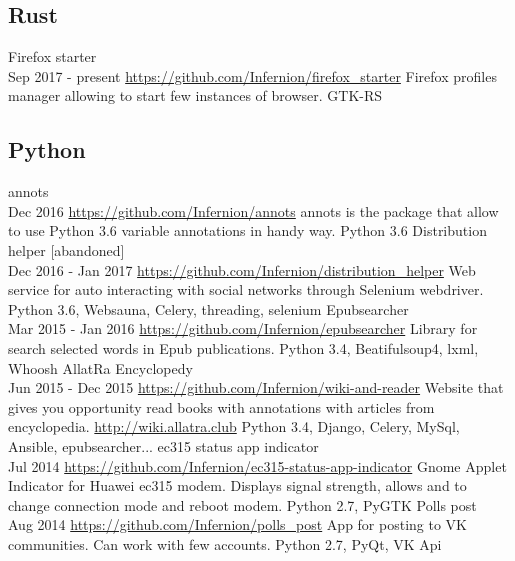 \documentclass[11pt,a4paper]{moderncv}
\begin{document}
	\subsection{Rust}
    \cvline
	{Firefox starter\\ Sep 2017 - present}
	{\url{https://github.com/Infernion/firefox_starter}\newline{}
		Firefox profiles manager allowing to start few instances of browser.\newline{}
		GTK-RS}
	\subsection{Python}
	\cvline
	{annots\\ Dec 2016}
	{\url{https://github.com/Infernion/annots}\newline{}
		annots is the package that allow to use Python 3.6 variable annotations in handy way.\newline{}
		Python 3.6}
	\cvline
	{Distribution helper [abandoned]\\ Dec 2016 - Jan 2017}
	{\url{https://github.com/Infernion/distribution_helper}\newline{}
		Web service for auto interacting with social networks through Selenium webdriver.\newline{}
		Python 3.6, Websauna, Celery, threading, selenium}
	\cvline
	{Epubsearcher\\ Mar 2015 - Jan 2016}
	{\url{https://github.com/Infernion/epubsearcher}\newline{}
		Library for search selected words in Epub publications.\newline{}
		Python 3.4, Beatifulsoup4, lxml, Whoosh}
	\cvline
	{AllatRa Encyclopedy\\ Jun 2015 - Dec 2015}
	{\url{https://github.com/Infernion/wiki-and-reader}\newline{}
	    Website that gives you opportunity read books with annotations
		with articles from encyclopedia. \url{http://wiki.allatra.club}\newline{}
		Python 3.4, Django, Celery, MySql, Ansible, epubsearcher...}
    \cvline
	{ec315 status app indicator\\ Jul 2014}
	{\url{https://github.com/Infernion/ec315-status-app-indicator}\newline{}
		Gnome Applet Indicator for Huawei ec315 modem. Displays signal strength, allows and to change connection mode and reboot modem.\newline{}
		Python 2.7, PyGTK }
	\cvline
	{Polls post\\ Aug 2014}
	{\url{https://github.com/Infernion/polls_post}\newline{}
		App for posting to VK communities. Can work with few accounts.\newline{}
		Python 2.7, PyQt, VK Api}
\end{document}
